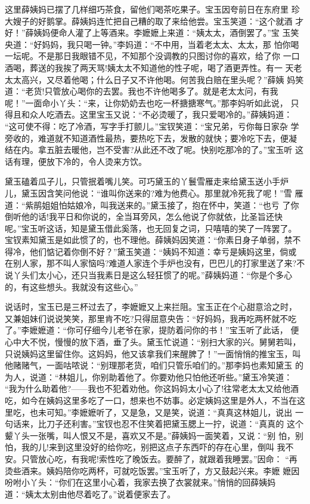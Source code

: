 这里薛姨妈已摆了几样细巧茶食，留他们喝茶吃果子。宝玉因夸前日在东府里
珍大嫂子的好鹅掌。薛姨妈连忙把自己糟的取了来给他尝。宝玉笑道：“这个就酒
才好！”薛姨妈便命人灌了上等酒来。李嬷嬷上来道：“姨太太，酒倒罢了。”宝
玉笑央道：“好妈妈，我只喝一钟。”李妈道：“不中用，当着老太太、太太，那
怕你喝一坛呢。不是那日我眼错不见，不知那个没调教的只图讨你的喜欢，给了你
一口酒喝，葬送的我挨了两天骂!姨太太不知道他的性子呢，喝了酒更弄性。有一
天老太太高兴，又尽着他喝；什么日子又不许他喝。何苦我白赔在里头呢？”薛姨
妈笑道：“老货!只管放心喝你的去罢。我也不许他喝多了。就是老太太问，有我
呢！”一面命小丫头：“来，让你奶奶去也吃一杯搪搪寒气。”那李妈听如此说，
只得且和众人吃酒去。这里宝玉又说：“不必烫暖了，我只爱喝冷的。”薛姨妈道：
“这可使不得：吃了冷酒，写字手打颤儿。”宝钗笑道：“宝兄弟，亏你每日家杂
学旁收的，难道就不知道酒性最热，要热吃下去，发散的就快；要冷吃下去，便凝
结在内。拿五脏去暖他，岂不受害?从此还不改了呢。快别吃那冷的了。”宝玉听
这话有理，便放下冷的，令人烫来方饮。

黛玉磕着瓜子儿，只管抿着嘴儿笑。可巧黛玉的丫鬟雪雁走来给黛玉送小手炉
儿，黛玉因含笑问他说：“谁叫你送来的?难为他费心。那里就冷死我了呢！”雪
雁道：“紫鹃姐姐怕姑娘冷，叫我送来的。”黛玉接了，抱在怀中，笑道：“也亏
了你倒听他的话!我平日和你说的，全当耳旁风，怎么他说了你就依，比圣旨还快
呢。”宝玉听这话，知是黛玉借此奚落，也无回复之词，只嘻嘻的笑了一阵罢了。
宝钗素知黛玉是如此惯了的，也不理他。薛姨妈因笑道：“你素日身子单弱，禁不
得冷，他们惦记着你倒不好？”黛玉笑道：“姨妈不知道：幸亏是姨妈这里，倘或
在别人家，那不叫人家恼吗?难道人家连个手炉也没有，巴巴儿的打家里送了来?不
说丫头们太小心，还只当我素日是这么轻狂惯了的呢。”薛姨妈道：“你是个多心
的，有这些想头。我就没有这些心。”

说话时，宝玉已是三杯过去了，李嬷嬷又上来拦阻。宝玉正在个心甜意洽之时，
又兼姐妹们说说笑笑，那里肯不吃?只得屈意央告：“好妈妈，我再吃两杯就不吃
了。”李嬷嬷道：“你可仔细今儿老爷在家，提防着问你的书！”宝玉听了此话，
便心中大不悦，慢慢的放下酒，垂了头。黛玉忙说道：“别扫大家的兴。舅舅若叫，
只说姨妈这里留住你。这妈妈，他又该拿我们来醒脾了！”一面悄悄的推宝玉，叫
他赌赌气，一面咕哝说：“别理那老货，咱们只管乐咱们的。”那李妈也素知黛玉
的为人，说道：“林姐儿，你别助着他了。你要劝他只怕他还听些。”黛玉冷笑道：
“我为什么助着他?——我也不犯着劝他。你这妈妈太小心了!往常老太太又给他酒
吃，如今在姨妈这里多吃了一口，想来也不妨事。必定姨妈这里是外人，不当在这
里吃，也未可知。”李嬷嬷听了，又是急，又是笑，说道：“真真这林姐儿，说出
一句话来，比刀子还利害。”宝钗也忍不住笑着把黛玉腮上一拧，说道：“真真的
这个颦丫头一张嘴，叫人恨又不是，喜欢又不是。”薛姨妈一面笑着，又说：“别
怕，别怕，我的儿!来到这里没好的给你吃，别把这点子东西吓的存在心里，倒叫
我不安。只管放心吃，有我呢!索性吃了晚饭去。要醉了，就跟着我睡罢。”因命：
“再烫些酒来。姨妈陪你吃两杯，可就吃饭罢。”宝玉听了，方又鼓起兴来。李嬷
嬷因吩咐小丫头：“你们在这里小心着，我家去换了衣裳就来。”悄悄的回薛姨妈
道：“姨太太别由他尽着吃了。”说着便家去了。

